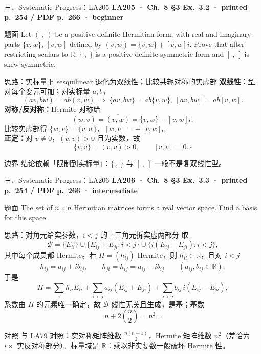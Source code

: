 \documentclass[aspectratio=169,10pt,fontset=none]{ctexbeamer}
\newcommand{\ex}[1]{\textcolor{accent}{\footnotesize\bfseries #1}}
\begin{document}
\begin{frame}[t]{三、Systematic Progress：LA205}
  \leavevmode\ex{LA205 · Ch.~8 §3 Ex.~3.2 · printed p.~254 / PDF p.~266 · beginner}
  \begin{block}{\footnotesize 题面}
    \scriptsize Let $(\ ,\ )$ be a positive definite Hermitian form, with real and imaginary parts $\{v,w\}$, $[v,w]$ defined by $(v,w)=\{v,w\}+[v,w]i$. Prove that after restricting scalars to $\mathbb R$, $\{\ ,\ \}$ is a positive definite symmetric form and $[\ ,\ ]$ is skew-symmetric.
  \end{block}
  \begin{exampleblock}{\footnotesize 思路：实标量下 sesquilinear 退化为双线性；比较共轭对称的实虚部}
    \scriptsize
    \textbf{双线性：}型对每个变元可加；对实标量 $a,b$，
    $$(av,bw)=ab(v,w)\ \Longrightarrow\ \{av,bw\}=ab\{v,w\},\ [av,bw]=ab[v,w].$$
    \textbf{对称/反对称：}Hermite 对称给
    $$(w,v)=\overline{(v,w)}=\{v,w\}-[v,w]i,$$
    比较实虚部得 $\{w,v\}=\{v,w\}$，$[w,v]=-[v,w]$。\\
    \textbf{正定：}对 $v\ne0$，$(v,v)>0$ 且为实数，故
    $$\{v,v\}=(v,v)>0,\qquad [v,v]=0.\ \square$$
  \end{exampleblock}
  \begin{block}{\footnotesize 边界}
    \scriptsize 结论依赖「限制到实标量」：$\{\ ,\ \}$ 与 $[\ ,\ ]$ 一般不是复双线性型。
  \end{block}
\end{frame}

\begin{frame}[t]{三、Systematic Progress：LA206}
  \leavevmode\ex{LA206 · Ch.~8 §3 Ex.~3.3 · printed p.~254 / PDF p.~266 · intermediate}
  \begin{block}{\footnotesize 题面}
    \scriptsize The set of $n\times n$ Hermitian matrices forms a real vector space. Find a basis for this space.
  \end{block}
  \begin{exampleblock}{\footnotesize 思路：对角元给实参数，$i<j$ 的上三角元拆实虚两部分}
    \scriptsize
    取
    $$\mathcal B=\{E_{ii}\}\cup\{E_{ij}+E_{ji}:i<j\}\cup\{i(E_{ij}-E_{ji}):i<j\},$$
    其中每个成员都 Hermite。若 $H=(h_{ij})$ Hermite，则 $h_{ii}\in\mathbb R$，且对 $i<j$
    $$h_{ij}=a_{ij}+ib_{ij},\qquad h_{ji}=\overline{h_{ij}}=a_{ij}-ib_{ij}\qquad(a_{ij},b_{ij}\in\mathbb R),$$
    于是
    $$H=\sum_i h_{ii}E_{ii}+\sum_{i<j}a_{ij}(E_{ij}+E_{ji})+\sum_{i<j}b_{ij}\,i(E_{ij}-E_{ji}),$$
    系数由 $H$ 的元素唯一确定，故 $\mathcal B$ 线性无关且生成，是基；基数
    $$n+2\binom n2=n^2.\ \square$$
  \end{exampleblock}
  \begin{block}{\footnotesize 对照}
    \scriptsize 与 LA79 对照：实对称矩阵维数 $\tfrac{n(n+1)}2$，Hermite 矩阵维数 $n^2$（差恰为 $i\times$ 实反对称部分）。标量域是 $\mathbb R$：乘以非实复数一般破坏 Hermite 性。
  \end{block}
\end{frame}
\end{document}
